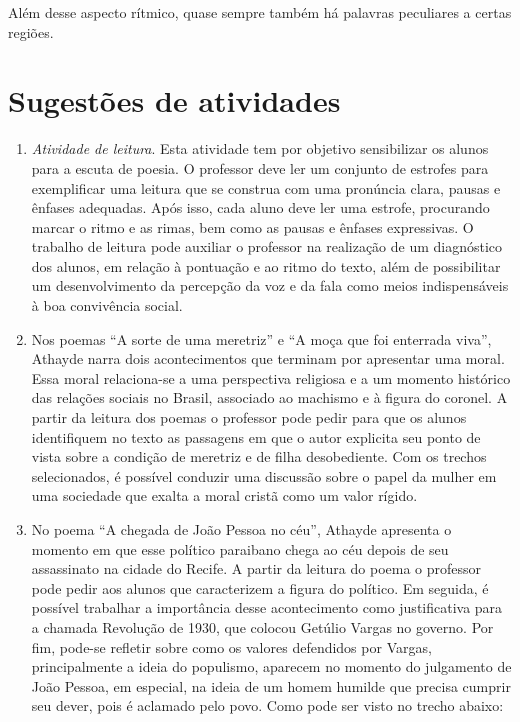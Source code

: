 Além desse aspecto rítmico, quase sempre também há palavras peculiares a
certas regiões. 

\pagebreak
\section{Sugestões de atividades}
\begin{enumerate}

\item \textit{Atividade de leitura}. Esta atividade tem por objetivo sensibilizar os
alunos para a escuta de poesia. O professor deve ler um conjunto de
estrofes para exemplificar uma leitura que se construa com uma
pronúncia clara, pausas e ênfases adequadas. Após isso, cada aluno deve
ler uma estrofe, procurando marcar o ritmo e as rimas, bem como as
pausas e ênfases expressivas. O trabalho de leitura pode auxiliar o
professor na realização de um diagnóstico dos alunos, em relação à
pontuação e ao ritmo do texto, além de possibilitar um desenvolvimento
da percepção da voz e da fala como meios indispensáveis à boa
convivência social.

\item Nos poemas ``A sorte de uma
meretriz'' e ``A moça que foi
enterrada viva'', Athayde narra dois acontecimentos
que terminam por apresentar uma moral. Essa moral relaciona-se a
uma perspectiva religiosa e a um momento histórico das relações
sociais no Brasil, associado ao machismo e à figura do coronel. A
partir da leitura dos poemas o professor pode pedir para que os alunos
identifiquem no texto as passagens em que o autor explicita seu ponto
de vista sobre a condição de meretriz e de filha desobediente. Com os
trechos selecionados, é possível conduzir uma discussão sobre o
papel da mulher em uma sociedade que exalta a moral
cristã como um valor rígido. 

\item No poema ``A chegada de João Pessoa no
céu'', Athayde apresenta o momento em que esse
político paraibano chega ao céu depois de seu assassinato na cidade do
Recife. A partir da leitura do poema o professor pode pedir aos alunos
que caracterizem a figura do político. Em seguida, é possível trabalhar
a importância desse acontecimento como justificativa para a chamada
Revolução de 1930, que colocou Getúlio Vargas no governo. Por fim,
pode-se refletir sobre como os valores defendidos por Vargas,
principalmente a ideia do populismo, aparecem no momento do julgamento
de João Pessoa, em especial, na ideia de um homem humilde que precisa
cumprir seu dever, pois é aclamado pelo povo. Como pode ser visto no
trecho abaixo:


\end{enumerate}
